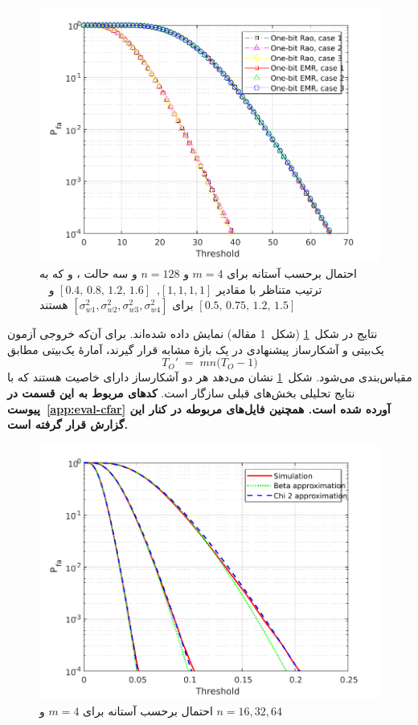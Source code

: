 \begin{figure}[!b]
	\centering
	\includegraphics[width=0.8\linewidth]{figs/cfar}
	\caption[احتمال  بر حسب آستانه]{
	احتمال  برحسب آستانه برای 
	$m=4$
	و
	$n=128$
	و سه حالت ،  و  که به ترتیب متناظر با مقادیر
	$
	[1,1,1,1]$,~$[0.4,\,0.8,\,1.2,\,1.6]$
	و ~$[0.5,\,0.75,\,1.2,\,1.5]$
	برای
	$[\sigma_{w1}^{2},\sigma_{w2}^{2},\sigma_{w3}^{2},\sigma_{w4}^{2}]$
	هستند
	}
	\label{fig:CFAR}
\end{figure} 

نتایج در شکل~\ref{fig:CFAR} (شکل~1 مقاله) نمایش داده شده‌اند.
برای آن‌که خروجی آزمون  یک‌بیتی و آشکارساز پیشنهادی در یک بازهٔ مشابه قرار گیرند، 
آمارۀ  یک‌بیتی مطابق
\[
T_{O}' \;=\; m n \big(T_{O}-1\big)
\]
مقیاس‌بندی می‌شود. 
شکل~\ref{fig:CFAR} نشان می‌دهد هر دو آشکارساز دارای خاصیت  هستند که با نتایج تحلیلی بخش‌های قبلی سازگار است.
\linebreak
\textbf{
	کدهای مربوط به این قسمت در  پیوست~\ref{app:eval-cfar} آورده شده است. همچنین فایل‌های مربوطه در کنار این گزارش قرار گرفته است.
}

\begin{figure}[!t]
	\centering
	\includegraphics[width=0.8\linewidth]{figs/false_alarm}
	\caption[احتمال  بر حسب آستانه برای $n$ های مختلف]{
		احتمال  برحسب آستانه برای 
		$m=4$
		و
		$n=16,32,64$
	}
	\label{fig:false_alarm}
\end{figure} 




